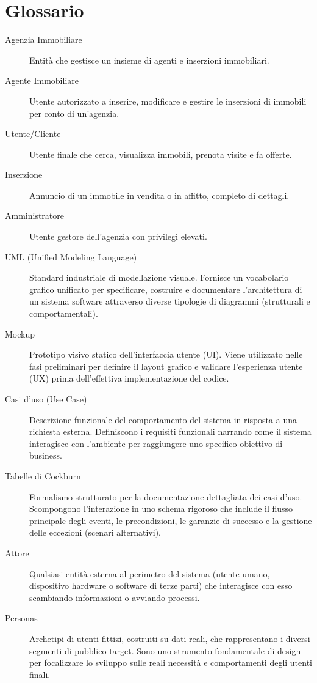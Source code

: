 \section{Glossario}
\begin{description}
    \item[Agenzia Immobiliare] Entità che gestisce un insieme di agenti e inserzioni immobiliari.
    \item[Agente Immobiliare] Utente autorizzato a inserire, modificare e gestire le inserzioni di immobili per conto di un'agenzia.
    \item[Utente/Cliente] Utente finale che cerca, visualizza immobili, prenota visite e fa offerte.
    \item[Inserzione] Annuncio di un immobile in vendita o in affitto, completo di dettagli.
    \item[Amministratore] Utente gestore dell'agenzia con privilegi elevati.
    \item[UML (Unified Modeling Language)] Standard industriale di modellazione visuale. Fornisce un vocabolario grafico unificato per specificare, costruire e documentare l'architettura di un sistema software attraverso diverse tipologie di diagrammi (strutturali e comportamentali).
    \item[Mockup] Prototipo visivo statico dell'interfaccia utente (UI). Viene utilizzato nelle fasi preliminari per definire il layout grafico e validare l'esperienza utente (UX) prima dell'effettiva implementazione del codice.
    \item[Casi d’uso (Use Case)] Descrizione funzionale del comportamento del sistema in risposta a una richiesta esterna. Definiscono i requisiti funzionali narrando come il sistema interagisce con l'ambiente per raggiungere uno specifico obiettivo di business.
    \item[Tabelle di Cockburn] Formalismo strutturato per la documentazione dettagliata dei casi d'uso. Scompongono l'interazione in uno schema rigoroso che include il flusso principale degli eventi, le precondizioni, le garanzie di successo e la gestione delle eccezioni (scenari alternativi).
    \item[Attore] Qualsiasi entità esterna al perimetro del sistema (utente umano, dispositivo hardware o software di terze parti) che interagisce con esso scambiando informazioni o avviando processi.
    \item[Personas] Archetipi di utenti fittizi, costruiti su dati reali, che rappresentano i diversi segmenti di pubblico target. Sono uno strumento fondamentale di design per focalizzare lo sviluppo sulle reali necessità e comportamenti degli utenti finali.

\end{description}
